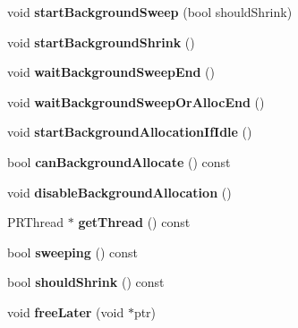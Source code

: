 \begin{DoxyCompactItemize}
\item 
\hypertarget{classjs_1_1_g_c_helper_thread_a44da6b1cfecf03b8f24e78e9381983fb}{void {\bfseries start\-Background\-Sweep} (bool should\-Shrink)}\label{classjs_1_1_g_c_helper_thread_a44da6b1cfecf03b8f24e78e9381983fb}

\item 
\hypertarget{classjs_1_1_g_c_helper_thread_a353ee432f676aa92a09641c4e1047163}{void {\bfseries start\-Background\-Shrink} ()}\label{classjs_1_1_g_c_helper_thread_a353ee432f676aa92a09641c4e1047163}

\item 
\hypertarget{classjs_1_1_g_c_helper_thread_a6c669746d133b8ab3aac8798d6a7e8bd}{void {\bfseries wait\-Background\-Sweep\-End} ()}\label{classjs_1_1_g_c_helper_thread_a6c669746d133b8ab3aac8798d6a7e8bd}

\item 
\hypertarget{classjs_1_1_g_c_helper_thread_adb5e740aaf5c0a21fcedf6c30ad9fa19}{void {\bfseries wait\-Background\-Sweep\-Or\-Alloc\-End} ()}\label{classjs_1_1_g_c_helper_thread_adb5e740aaf5c0a21fcedf6c30ad9fa19}

\item 
\hypertarget{classjs_1_1_g_c_helper_thread_a9a2955af1888f945033e09790185cd1a}{void {\bfseries start\-Background\-Allocation\-If\-Idle} ()}\label{classjs_1_1_g_c_helper_thread_a9a2955af1888f945033e09790185cd1a}

\item 
\hypertarget{classjs_1_1_g_c_helper_thread_a1fd7c6b30b84b549781452c141af0d39}{bool {\bfseries can\-Background\-Allocate} () const }\label{classjs_1_1_g_c_helper_thread_a1fd7c6b30b84b549781452c141af0d39}

\item 
\hypertarget{classjs_1_1_g_c_helper_thread_a3b60b36d5d9b9e81907fdd65e08224dd}{void {\bfseries disable\-Background\-Allocation} ()}\label{classjs_1_1_g_c_helper_thread_a3b60b36d5d9b9e81907fdd65e08224dd}

\item 
\hypertarget{classjs_1_1_g_c_helper_thread_a86db04ca2b9da75205cd2f2cd713f664}{P\-R\-Thread $\ast$ {\bfseries get\-Thread} () const }\label{classjs_1_1_g_c_helper_thread_a86db04ca2b9da75205cd2f2cd713f664}

\item 
\hypertarget{classjs_1_1_g_c_helper_thread_a92c779f97fdef04628df43c87909ab91}{bool {\bfseries sweeping} () const }\label{classjs_1_1_g_c_helper_thread_a92c779f97fdef04628df43c87909ab91}

\item 
\hypertarget{classjs_1_1_g_c_helper_thread_a735be4e83a7445f413bd58b2da9d4127}{bool {\bfseries should\-Shrink} () const }\label{classjs_1_1_g_c_helper_thread_a735be4e83a7445f413bd58b2da9d4127}

\item 
\hypertarget{classjs_1_1_g_c_helper_thread_ad96662b71be74d124f4a55e9c82b05ee}{void {\bfseries free\-Later} (void $\ast$ptr)}\label{classjs_1_1_g_c_helper_thread_ad96662b71be74d124f4a55e9c82b05ee}

\end{DoxyCompactItemize}
